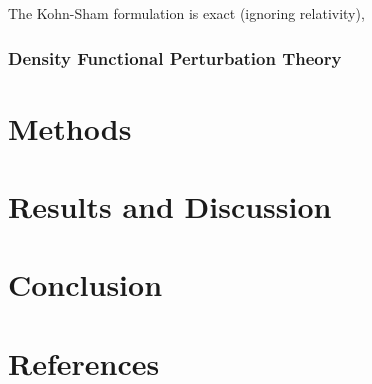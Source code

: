 \documentclass[12pt]{article}
\begin{document}
The Kohn-Sham formulation is exact (ignoring relativity), 
\subsubsection{Density Functional Perturbation Theory}

\section{Methods}


\section{Results and Discussion}

\section{Conclusion}

\section{References}





\appendix
\end{document}
